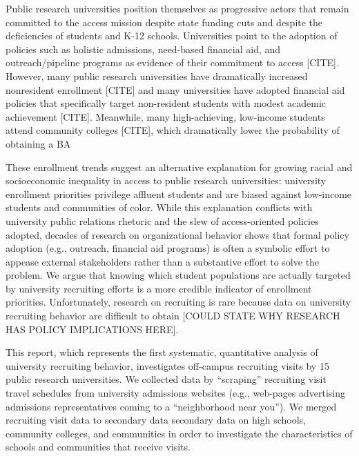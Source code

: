 \documentclass[twoside]{article}
\begin{document}
Public research universities position themselves as progressive actors that remain committed to the access mission despite state funding cuts and despite the deficiencies of students and K-12 schools.  Universities point to the adoption of policies such as holistic admissions, need-based financial aid, and outreach/pipeline programs as evidence of their commitment to access [CITE].  However, many public research universities have dramatically increased nonresident enrollment [CITE] and many universities have adopted financial aid policies that specifically target non-resident students with modest academic achievement [CITE]. Meanwhile, many high-achieving, low-income students attend community colleges [CITE], which dramatically lower the probability of obtaining a BA

These enrollment trends suggest an alternative explanation for growing racial and socioeconomic inequality in access to public  research universities: university enrollment priorities privilege affluent students and are biased against low-income students and communities of color.  While this explanation conflicts with university public relations rhetoric and the slew of access-oriented policies adopted, decades of research on organizational behavior shows that formal policy adoption (e.g., outreach, financial aid programs) is often a symbolic effort to appease external stakeholders rather than a substantive effort to solve the problem.  We argue that knowing which student populations are actually targeted by university recruiting efforts is a more credible indicator of enrollment priorities. Unfortunately, research on recruiting is rare because data on university recruiting behavior are difficult to obtain [COULD STATE WHY RESEARCH HAS POLICY IMPLICATIONS HERE].

This report, which represents the first systematic, quantitative analysis of university recruiting behavior, investigates off-campus recruiting visits by 15 public research universities.  We collected data by ``scraping'' recruiting visit travel schedules from university admissions websites (e.g., web-pages advertising admissions representatives coming to a ``neighborhood near you'').  We merged recruiting visit data to secondary data secondary data on high schools, community colleges, and communities in order to investigate the characteristics of schools and communities that receive visits.  
\end{document}
